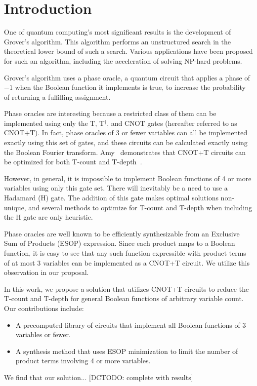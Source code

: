 \section{Introduction}
One of quantum computing's most significant results is the development of Grover's algorithm. This algorithm performs an unstructured search in the theoretical lower bound of such a search. Various applications have been proposed for such an algorithm, including the acceleration of solving NP-hard problems.

Grover's algorithm uses a phase oracle, a quantum circuit that applies a phase of $-1$ when the Boolean function it implements is true, to increase the probability of returning a fulfilling assignment.

Phase oracles are interesting because a restricted class of them can be implemented using only the T, T$^\dagger$, and CNOT gates (hereafter referred to as CNOT+T). In fact, phase oracles of 3 or fewer variables can all be implemented exactly using this set of gates, and these circuits can be calculated exactly using the Boolean Fourier transform. Amy~\cite{amy2018} demonstrates that CNOT+T circuits can be optimized for both T-count and T-depth~\cite{amy_matroid}.

However, in general, it is impossible to implement Boolean functions of 4 or more variables using only this gate set. There will inevitably be a need to use a Hadamard (H) gate. The addition of this gate makes optimal solutions non-unique, and several methods to optimize for T-count and T-depth when including the H gate are only heuristic.

Phase oracles are well known to be efficiently synthesizable from an Exclusive Sum of Products (ESOP) expression. Since each product maps to a Boolean function, it is easy to see that any such function expressible with product terms of at most 3 variables can be implemented as a CNOT+T circuit. We utilize this observation in our proposal.

In this work, we propose a solution that utilizes CNOT+T circuits to reduce the T-count and T-depth for general Boolean functions of arbitrary variable count. Our contributions include:

\begin{itemize}
    \item A precomputed library of circuits that implement all Boolean functions of 3 variables or fewer.
    \item A synthesis method that uses ESOP minimization to limit the number of product terms involving 4 or more variables.
\end{itemize}

We find that our solution... [DCTODO: complete with results]
